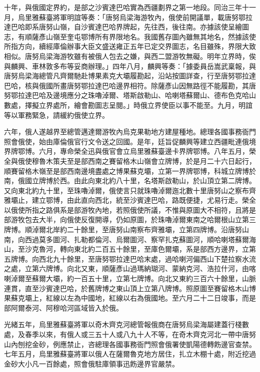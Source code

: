 \begin{pinyinscope}
十年，與俄國定界約，是部之沙賓達巴哈實為西疆劃界之第一地段。同治三年十一月，烏里雅蘇臺將軍明誼等奏：「唐努烏梁海游牧內，俄使前開議單，載唐努鄂拉達巴哈即系唐努山嶺，自沙賓達巴哈界牌起，先往西，後往南。亦據該使呈繪圖志，有順薩彥山嶺至奎屯鄂博所有界限地名。我國舊存圖內雖無其地名，然據該使所指方向，續經庫倫辦事大臣文盛送雍正五年已定交界圖志，名目雖殊，界限大致相似。唐努烏梁海游牧雖有被俄人包去之嫌，與西二盟游牧無礙。明年立界時，俟與麟興、車林敦多布等妥商辦理。」四年八月，麟興等奏：「據委員岳嵩武稟報，與唐努烏梁海總管凡齊爾馳赴博果素克大壩履勘起，沿站按圖詳查，行至唐努鄂拉達巴哈，核與俄國所畫唐努鄂拉達巴哈邊界相符。除薩彥山因無路徑不能履勘，其唐努鄂拉達巴哈及邊境應分之珠嚕淖爾、塔斯啟勒山、哈喇塔蘇爾山、德布色克哈山數處，擇擬立界處所，繪會勘圖志呈閱。」時俄立界使臣以事不能至。九月，明誼等以軍務緊急，請緩約俄使立界。

六年，俄人遂越界至總管邁達爾游牧內烏克果勒地方建屋種地。總理各國事務衙門照會俄使，始由庫倫俄官行文令送之回國。是年，廷旨促麟興等建立西疆毗連俄境界牌鄂博。六月，專命榮全迅與俄官會立烏里雅蘇臺邊卡界牌鄂博。八年五月，榮全與俄使穆魯木策夫至是部西南之賽留格木山嶺會立牌博，於是月二十六日起行，順賽留格木嶺至是部西南邊境盡處之博果蘇克壩，立第一界牌鄂博，科城立牌博於南，俄國立牌博於西。由此向東北約八十里，名塔斯啟勒山，於山頂立第二牌博。又向東北約九十里，至珠嚕淖爾，俄使言只就珠嚕淖爾迤北數十里唐努山之察布齊雅壩止，建立鄂博，由此直向西北，統至沙賓達巴哈，路既便捷，尤易行走。榮全以俄使所指之路俱系是部游牧內地，若照俄使所議，不惟與原圖大不相符，且將是部游牧包去大半，向俄使反復開導，仍如原圖，於珠嚕淖爾東南之哈爾根山立第三牌博。順淖爾北岸約二十餘里，至唐努山南察布齊雅壩，立第四牌博。沿唐努山南，向西過莫多圖河、扎勒都倫河、烏爾圖河、察罕扎克蘇圖河，順哈喇塔蘇爾海山，至沙克魯河，轉向東北約二百五十餘里，至庫色爾壩，系是部西方邊界，立第五牌博。向西北九十餘里，至唐努鄂拉達巴哈末處，過哈喇河偏西山下楚拉察水流之處，立第六牌博。向北又東，順薩彥山過瑪納瑚河、蒙納克河、浩拉什河，由喀喇淖爾至蘇爾大壩，約一百五十里，立第七牌博。向北又東約三百六十餘里，山脈連貫，直至沙賓達巴哈，於舊牌博之東山頂上立第八牌博。照原圖至賽留格木山博果蘇克壩上，紅線以左為中國地，紅線以右為俄國地。至六月二十二日竣事，而是部阿爾泰河、阿穆哈河區域皆入於俄。

光緒五年，烏里雅蘇臺將軍以奇木齊克河總管報俄商在唐努烏梁海屬建蓋行棧數處，及春季以來，有俄人或三五十人或八九十人不等，在奇木齊克河北一帶中唐努山內刨挖金砂，例應禁止，咨總理各國事務衙門照會俄署使凱陽德轉飭邊官查禁。七年五月，烏里雅蘇臺將軍以俄人在薩爾魯克地方居住，扎立木棚十處，附近挖過金砂大小凡一百餘處，照會俄駐庫領事迅飭邊界官嚴禁。


\end{pinyinscope}
